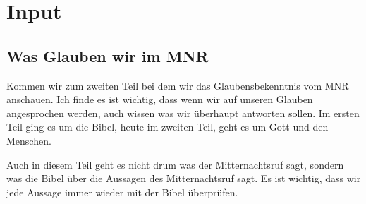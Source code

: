 \documentclass{../../inc/mybib}
\begin{document}
\section{ Input }
\begin{spacing}{1.5}
\subsection{Was Glauben wir im MNR}
Kommen wir zum zweiten Teil bei dem wir das Glaubensbekenntnis vom MNR anschauen. Ich finde es ist wichtig, dass wenn wir auf unseren Glauben angesprochen werden, auch wissen was wir überhaupt antworten sollen. Im ersten Teil ging es um die Bibel, heute im zweiten Teil, geht es um Gott und den Menschen.

Auch in diesem Teil geht es nicht drum was der Mitternachtsruf sagt, sondern was die Bibel über die Aussagen des Mitternachtsruf sagt. Es ist wichtig, dass wir jede Aussage immer wieder mit der Bibel überprüfen.


\end{spacing}
\end{document}
